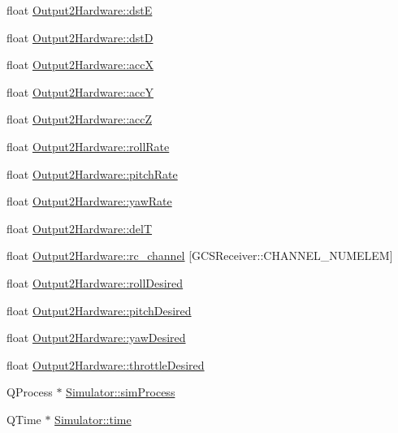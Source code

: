 \begin{DoxyCompactItemize}
\item 
float \hyperlink{group___h_i_t_l_plugin_ga5d4746c1f8dd9251dd5b37ced82d4a93}{\-Output2\-Hardware\-::dst\-E}
\item 
float \hyperlink{group___h_i_t_l_plugin_gaf1362ebbee3efc97a9c205aaffdeb98a}{\-Output2\-Hardware\-::dst\-D}
\item 
float \hyperlink{group___h_i_t_l_plugin_gaf15a299d1ff6f64a04c72d9ef5bf3860}{\-Output2\-Hardware\-::acc\-X}
\item 
float \hyperlink{group___h_i_t_l_plugin_ga3ce16295c4d5bfc0a4938f0120d946c4}{\-Output2\-Hardware\-::acc\-Y}
\item 
float \hyperlink{group___h_i_t_l_plugin_ga8565b780814dd8fddf28e4018256356a}{\-Output2\-Hardware\-::acc\-Z}
\item 
float \hyperlink{group___h_i_t_l_plugin_ga81680dc2663395de5b3f4aeaeb9f35f9}{\-Output2\-Hardware\-::roll\-Rate}
\item 
float \hyperlink{group___h_i_t_l_plugin_ga9d3248d73390ba0b13ca165ee1f1fef0}{\-Output2\-Hardware\-::pitch\-Rate}
\item 
float \hyperlink{group___h_i_t_l_plugin_gab54300de73ca6f11f519068435673210}{\-Output2\-Hardware\-::yaw\-Rate}
\item 
float \hyperlink{group___h_i_t_l_plugin_gadbdb09f62a5ce0e914e8551ce3bd0bbd}{\-Output2\-Hardware\-::del\-T}
\item 
float \hyperlink{group___h_i_t_l_plugin_gadf58977eef899196280267ae39cc6f65}{\-Output2\-Hardware\-::rc\-\_\-channel} \mbox{[}\-G\-C\-S\-Receiver\-::\-C\-H\-A\-N\-N\-E\-L\-\_\-\-N\-U\-M\-E\-L\-E\-M\mbox{]}
\item 
float \hyperlink{group___h_i_t_l_plugin_ga56fde0222228b19a5ed9e89efd765da0}{\-Output2\-Hardware\-::roll\-Desired}
\item 
float \hyperlink{group___h_i_t_l_plugin_ga29bbb9f720db0b7039f92a3afcb785a3}{\-Output2\-Hardware\-::pitch\-Desired}
\item 
float \hyperlink{group___h_i_t_l_plugin_gaf01c33ffb5c7695348739d0070122bd7}{\-Output2\-Hardware\-::yaw\-Desired}
\item 
float \hyperlink{group___h_i_t_l_plugin_gab6902f4f38e771b9d499521d861661f2}{\-Output2\-Hardware\-::throttle\-Desired}
\item 
\-Q\-Process $\ast$ \hyperlink{group___h_i_t_l_plugin_ga28f5833f779eb659394e6c6cfe6f2331}{\-Simulator\-::sim\-Process}
\item 
\-Q\-Time $\ast$ \hyperlink{group___h_i_t_l_plugin_ga162228fbfec7737c989bfe0b340e8617}{\-Simulator\-::time}

\end{DoxyCompactItemize}
